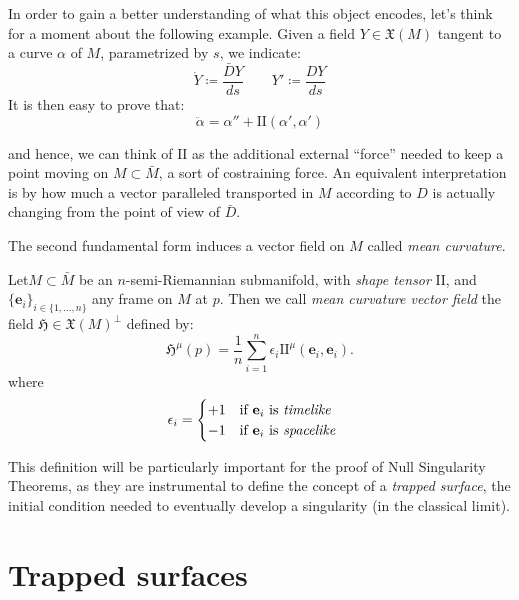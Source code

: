 In order to gain a better understanding of what this object encodes, let's think for a moment about the following example. Given a field \(Y \in \mathfrak{X}(M)\) tangent to a curve \(\alpha\) of \(M\), parametrized by \(s\), we indicate:
\[
\dot{Y} \coloneqq \frac{\bar{D}Y}{ds} \quad \quad Y' \coloneqq \frac{DY}{ds}
\]
It is then easy to prove that:
\[
\ddot{\alpha} = \alpha'' + \mathrm{I\!I}(\alpha', \alpha')
\]

and hence, we can think of \(\mathrm{I\!I}\) as the additional external ``force'' needed to keep a point moving on \(M \subset \bar{M}\), a sort of costraining force. An equivalent interpretation is by how much a vector paralleled transported in \(M\) according to \(D\) is actually changing from the point of view of \(\bar{D}\).



The second fundamental form induces a vector field on \(M\) called \emph{mean curvature}.
\begin{definition}
		Let\(M \subset \bar{M}\) be an  \(n\)-semi-Riemannian submanifold, with \emph{shape tensor} \(\mathrm{I\!I}\), and \(\{\textbf{e}_i\}_{i \in \{1, \ldots, n\}}\) any frame on \(M\) at \(p\). Then we call \emph{mean curvature vector field} the field \(\mathfrak{H} \in \mathfrak{X}(M)^{\perp} \) defined by:
		\[
		\mathfrak{H}^{\mu}(p) = \frac{1}{n} \sum_{i=1}^{n} \epsilon_i \mathrm{I\!I}^{\mu}(\textbf{e}_i, \textbf{e}_i).
		\]
		where 
		\[
		\epsilon_i = 
		\begin{cases}
		+1 \quad \text{if } \textbf{e}_i \text{ is \emph{timelike}} \\
		-1 \quad \text{if } \textbf{e}_i \text{ is \emph{spacelike}}
		\end{cases}
		\]
\end{definition}


This definition will be particularly important for the proof of Null Singularity Theorems, as they are instrumental to define the concept of a \emph{trapped surface}, the initial condition needed to eventually develop a singularity (in the classical limit). 

\section{Trapped surfaces}

